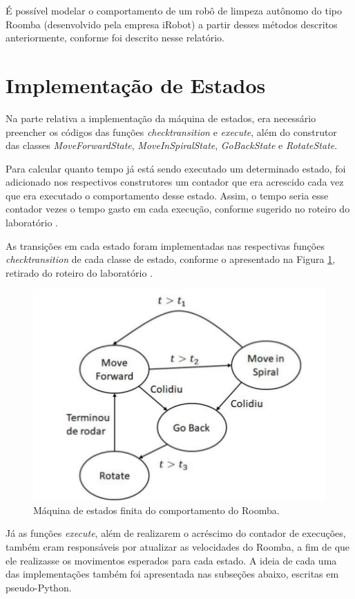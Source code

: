 \documentclass[conference]{IEEEtran}
\begin{document}
É possível modelar o comportamento de um robô de limpeza autônomo do tipo Roomba (desenvolvido pela empresa iRobot) a partir desses métodos descritos anteriormente, conforme foi descrito nesse relatório.

\section{Implementação de Estados}
Na parte relativa a implementação da máquina de estados, era necessário preencher os códigos das funções \textit{check\underline{\space}transition} e \textit{execute}, além do construtor das classes \textit{MoveForwardState}, \textit{MoveInSpiralState}, \textit{GoBackState} e \textit{RotateState}.

Para calcular quanto tempo já está sendo executado um determinado estado, foi adicionado nos respectivos construtores um contador que era acrescido cada vez que era executado o comportamento desse estado. Assim, o tempo seria esse contador vezes o tempo gasto em cada execução, conforme sugerido no roteiro do laboratório \cite{b1}.

As transições em cada estado foram implementadas nas respectivas funções \textit{check\underline{\space}transition} de cada classe de estado, conforme o apresentado na Figura \ref{state_machine}, retirado do roteiro do laboratório \cite{b1}.

\begin{figure}[htbp]
\centerline{\includegraphics[scale=0.4]{maquina_estados.png}}
\caption{Máquina de estados finita do comportamento do Roomba.}
\label{state_machine}
\end{figure}

Já as funções \textit{execute}, além de realizarem o acréscimo do contador de execuções, também eram responsáveis por atualizar as velocidades do Roomba, a fim de que ele realizasse os movimentos esperados para cada estado. A ideia de cada uma das implementações também foi apresentada nas subseções abaixo, escritas em pseudo-Python.
\end{document}
